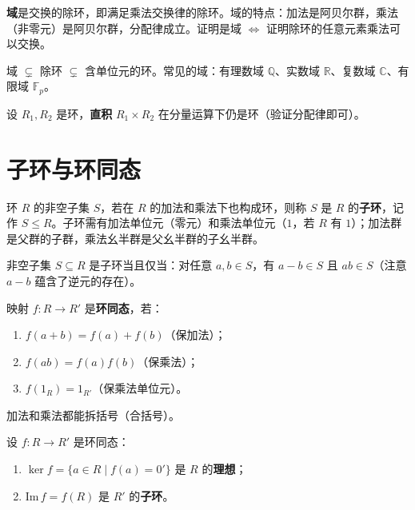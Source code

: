 \begin{definition}[域（定义 2.5）]
\textbf{域}是交换的除环，即满足乘法交换律的除环。域的特点：加法是阿贝尔群，乘法（非零元）是阿贝尔群，分配律成立。证明是域 $\Leftrightarrow$ 证明除环的任意元素乘法可以交换。
\end{definition}

\begin{note}
域 $\subsetneq$ 除环 $\subsetneq$ 含单位元的环。常见的域：有理数域 $\mathbb{Q}$、实数域 $\mathbb{R}$、复数域 $\mathbb{C}$、有限域 $\mathbb{F}_p$。
\end{note}

\begin{proposition}[命题 2.5：环的直积]
设 $R_1, R_2$ 是环，\textbf{直积} $R_1 \times R_2$ 在分量运算下仍是环（验证分配律即可）。
\end{proposition}

\section{子环与环同态}

\begin{definition}[子环（定义 2.6）]
环 $R$ 的非空子集 $S$，若在 $R$ 的加法和乘法下也构成环，则称 $S$ 是 $R$ 的\textbf{子环}，记作 $S \le R$。子环需有加法单位元（零元）和乘法单位元（$1$，若 $R$ 有 $1$）；加法群是父群的子群，乘法幺半群是父幺半群的子幺半群。
\end{definition}

\begin{lemma}[引理 2.1：子环等价条件]
非空子集 $S \subseteq R$ 是子环当且仅当：对任意 $a, b \in S$，有 $a - b \in S$ 且 $ab \in S$（注意 $a-b$ 蕴含了逆元的存在）。
\end{lemma}

\begin{definition}[环同态（定义 2.9）]
映射 $f\colon R \to R'$ 是\textbf{环同态}，若：
\begin{enumerate}
  \item $f(a + b) = f(a) + f(b)$（保加法）；
  \item $f(ab) = f(a)f(b)$（保乘法）；
  \item $f(1_R) = 1_{R'}$（保乘法单位元）。
\end{enumerate}
加法和乘法都能拆括号（合括号）。
\end{definition}

\begin{proposition}[命题 2.8：核与像的结构]
设 $f\colon R \to R'$ 是环同态：
\begin{enumerate}
  \item $\ker f = \{a \in R \mid f(a) = 0'\}$ 是 $R$ 的\textbf{理想}；
  \item $\mathrm{Im}\, f = f(R)$ 是 $R'$ 的\textbf{子环}。
\end{enumerate}
\end{proposition}


